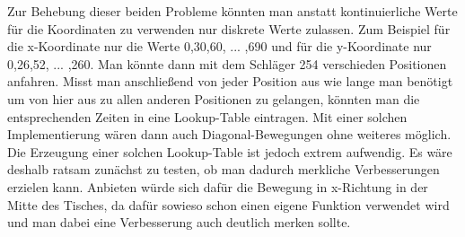 Zur Behebung dieser beiden Probleme könnten man anstatt kontinuierliche Werte für die Koordinaten zu verwenden nur diskrete Werte zulassen. Zum Beispiel für die x-Koordinate nur die Werte 0,30,60, ... ,690 und für die y-Koordinate nur 0,26,52, ... ,260. Man könnte dann mit dem Schläger 254 verschieden Positionen anfahren. Misst man anschließend von jeder Position aus wie lange man benötigt um von hier aus zu allen anderen Positionen zu gelangen, könnten man die entsprechenden Zeiten in eine Lookup-Table eintragen. Mit einer solchen Implementierung wären dann auch Diagonal-Bewegungen ohne weiteres möglich. Die Erzeugung einer solchen Lookup-Table ist jedoch extrem aufwendig. Es wäre deshalb ratsam zunächst zu testen, ob man dadurch merkliche Verbesserungen erzielen kann. Anbieten würde sich dafür die Bewegung in x-Richtung in der Mitte des Tisches, da dafür sowieso schon einen eigene Funktion verwendet wird und man dabei eine Verbesserung auch deutlich merken sollte. 